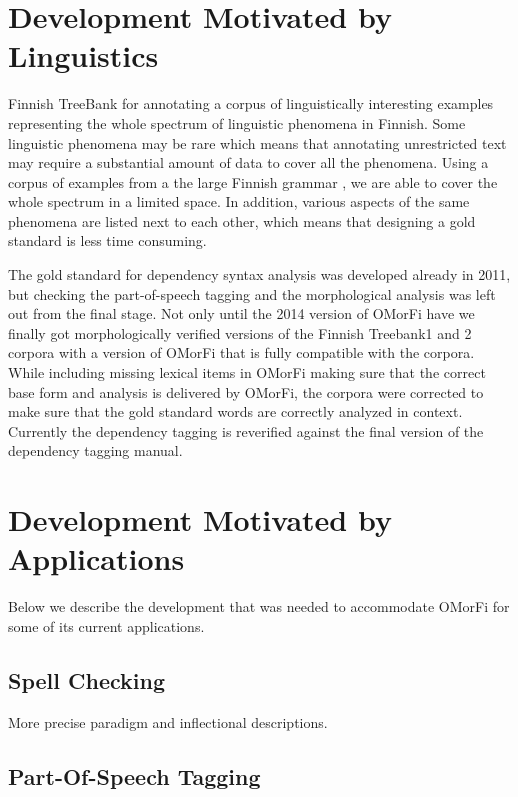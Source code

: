 \documentclass[11pt]{article}
\begin{document}
\section{Development Motivated by Linguistics}

Finnish TreeBank for annotating a corpus of linguistically interesting examples
representing the whole spectrum of linguistic phenomena in Finnish.  Some
linguistic phenomena may be rare which means that annotating unrestricted text
may require a substantial amount of data to cover all the phenomena.  Using a
corpus of examples from a the large Finnish grammar \cite{visk}, we are
able to cover the whole spectrum in a limited space.  In addition, various
aspects of the same phenomena are listed next to each other, which means that
designing a gold standard is less time consuming.

The gold standard for dependency syntax analysis was developed already in 2011,
but checking the part-of-speech tagging and the morphological analysis was left
out from the final stage.  Not only until the 2014 version of OMorFi have we
finally got morphologically verified versions of the Finnish Treebank1 and 2
corpora with a version of OMorFi that is fully compatible with the corpora.
While including missing lexical items in OMorFi making sure that the correct
base form and analysis is delivered by OMorFi, the corpora were corrected to
make sure that the gold standard words are correctly analyzed in context.
Currently the dependency tagging is reverified against the final version of the
dependency tagging manual. 

\section{Development Motivated by Applications}

Below we describe the development that was needed to accommodate OMorFi for some of its current applications.

\subsection{Spell Checking}

More precise paradigm and inflectional descriptions.

\subsection{Part-Of-Speech Tagging}
\end{document}
